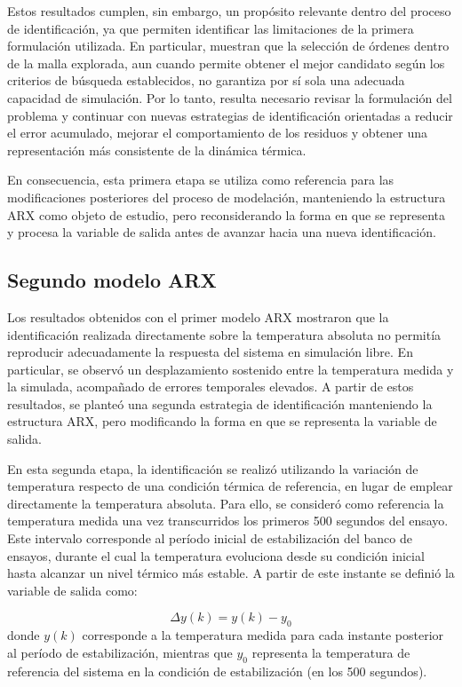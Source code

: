 \documentclass[11pt]{report}
\begin{document}
Estos resultados cumplen, sin embargo, un propósito relevante dentro del proceso de identificación, ya que permiten identificar las limitaciones de la primera formulación utilizada. En particular, muestran que la selección de órdenes dentro de la malla explorada, aun cuando permite obtener el mejor candidato según los criterios de búsqueda establecidos, no garantiza por sí sola una adecuada capacidad de simulación. Por lo tanto, resulta necesario revisar la formulación del problema y continuar con nuevas estrategias de identificación orientadas a reducir el error acumulado, mejorar el comportamiento de los residuos y obtener una representación más consistente de la dinámica térmica.

En consecuencia, esta primera etapa se utiliza como referencia para las modificaciones posteriores del proceso de modelación, manteniendo la estructura ARX como objeto de estudio, pero reconsiderando la forma en que se representa y procesa la variable de salida antes de avanzar hacia una nueva identificación.

\subsection{Segundo modelo ARX}

Los resultados obtenidos con el primer modelo ARX mostraron que la identificación realizada directamente sobre la temperatura absoluta no permitía reproducir adecuadamente la respuesta del sistema en simulación libre. En particular, se observó un desplazamiento sostenido entre la temperatura medida y la simulada, acompañado de errores temporales elevados. A partir de estos resultados, se planteó una segunda estrategia de identificación manteniendo la estructura ARX, pero modificando la forma en que se representa la variable de salida.

En esta segunda etapa, la identificación se realizó utilizando la variación de temperatura respecto de una condición térmica de referencia, en lugar de emplear directamente la temperatura absoluta. Para ello, se consideró como referencia la temperatura medida una vez transcurridos los primeros 500 segundos del ensayo. Este intervalo corresponde al período inicial de estabilización del banco de ensayos, durante el cual la temperatura evoluciona desde su condición inicial hasta alcanzar un nivel térmico más estable. A partir de este instante se definió la variable de salida como:

$$\Delta y(k)=y(k)-y_0$$
donde $y(k)$ corresponde a la temperatura medida para cada instante posterior al período de estabilización, mientras que $y_0$ representa la temperatura de referencia del sistema en la condición de estabilización (en los 500 segundos).
\end{document}
